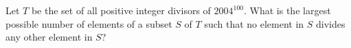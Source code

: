 Let $ T$ be the set of all positive integer divisors of $ 2004^{100}$. What is the largest possible number of elements of a subset $ S$ of $ T$ such that no element in $ S$ divides any other element in $ S$?